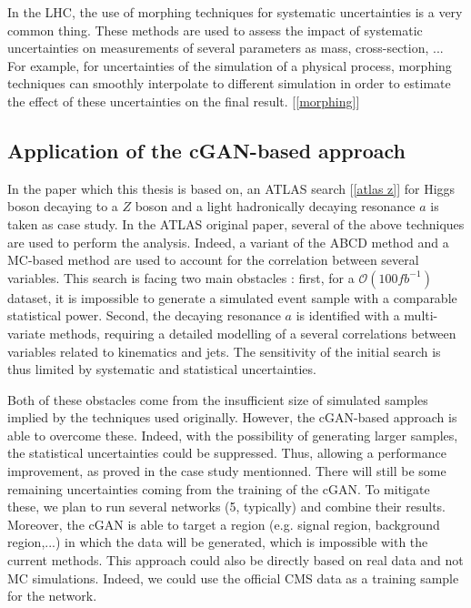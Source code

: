 In the LHC, the use of morphing techniques for systematic uncertainties is a very common thing. These methods are used to assess the impact of systematic uncertainties on measurements of several parameters as mass, cross-section, ... For example, for uncertainties of the simulation of a physical process, morphing techniques can smoothly interpolate to different simulation in order to estimate the effect of these uncertainties on the final result. [\ref{morphing}]

\subsection{Application of the cGAN-based approach}

In the paper which this thesis is based on, an ATLAS search [\ref{atlas z}] for Higgs boson decaying to a $Z$ boson and a light hadronically decaying resonance $a$ is taken as case study. In the ATLAS original paper, several of the above techniques are used to perform the analysis. Indeed, a variant of the ABCD method and a MC-based method are used to account for the correlation between several variables.  This search is facing two main obstacles : first, for a $\mathcal{O}(100fb^{-1})$ dataset, it is impossible to generate a simulated event sample with a comparable statistical power. Second, the decaying resonance $a$ is identified with a multi-variate methods, requiring a detailed modelling of a several correlations between variables related to kinematics and jets. The sensitivity of the initial search is thus limited by systematic and statistical uncertainties. 

Both of these obstacles come from the insufficient size of simulated samples implied by the techniques used originally. However, the cGAN-based approach is able to overcome these. Indeed, with the possibility of generating larger samples, the statistical uncertainties could be suppressed. Thus, allowing a performance improvement, as proved in the case study mentionned. There will still be some remaining uncertainties coming from the training of the cGAN. To mitigate these, we plan to run several networks (5, typically) and combine their results.
Moreover, the cGAN is able to target a region (e.g. signal region, background region,...) in which the data will be generated, which is impossible with the current methods. This approach could also be directly based on real data and not MC simulations. Indeed, we could use the official CMS data as a training sample for the network.

